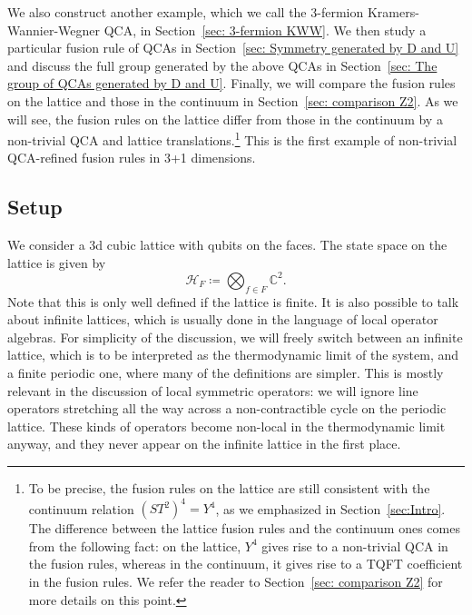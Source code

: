 \documentclass[aps,twocolumn,prx,floatfix,preprintnumbers, nofootinbib,10pt]{revtex4-2}
\numberwithin{equation}{section}
\theoremstyle{definition}
\theoremstyle{remark}
\theoremstyle{claim}
\begin{document}
We also construct another example, which we call the 3-fermion Kramers-Wannier-Wegner QCA, in Section~\ref{sec: 3-fermion KWW}.
We then study a particular fusion rule of QCAs in Section~\ref{sec: Symmetry generated by D and U} and discuss the full group generated by the above QCAs in Section~\ref{sec: The group of QCAs generated by D and U}.
Finally, we will compare the fusion rules on the lattice and those in the continuum in Section~\ref{sec: comparison Z2}.
As we will see, the fusion rules on the lattice differ from those in the continuum by a non-trivial QCA and lattice translations.\footnote{To be precise, the fusion rules on the lattice are still consistent with the continuum relation $(ST^2)^4 = Y^4$, as we emphasized in Section~\ref{sec:Intro}. The difference between the lattice fusion rules and the continuum ones comes from the following fact: on the lattice, $Y^4$ gives rise to a non-trivial QCA in the fusion rules, whereas in the continuum, it gives rise to a TQFT coefficient in the fusion rules. We refer the reader to Section~\ref{sec: comparison Z2} for more details on this point.} 
This is the first example of non-trivial QCA-refined fusion rules in 3+1 dimensions.

\subsection{Setup}\label{sec:setup_qca_on_Z2_subalg}

We consider a 3d cubic lattice with qubits on the faces.
The state space on the lattice is given by
\begin{equation}
\mathcal{H}_F \coloneq \bigotimes_{f \in F} \mathbb{C}^2.
\label{eq: qubit Hilb}
\end{equation}
Note that this is only well defined if the lattice is finite. It is also possible to talk about infinite lattices, which is usually done in the language of local operator algebras. For simplicity of the discussion, we will freely switch between an infinite lattice, which is to be interpreted as the thermodynamic limit of the system, and a finite periodic one, where many of the definitions are simpler. This is mostly relevant in the discussion of local symmetric operators: we will ignore line operators stretching all the way across a non-contractible cycle on the periodic lattice. These kinds of operators become non-local in the thermodynamic limit anyway, and they never appear on the infinite lattice in the first place.
\end{document}
